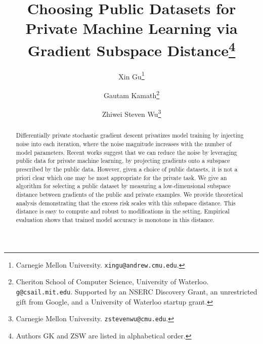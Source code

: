 \documentclass[11pt]{article}
\title{Choosing Public Datasets for Private Machine Learning via Gradient Subspace Distance\thanks{Authors GK and ZSW are listed in alphabetical order.}}
\author{
Xin Gu\thanks{Carnegie Mellon University. {\tt xingu@andrew.cmu.edu}.}
\and
Gautam Kamath\thanks{Cheriton School of Computer Science, University of Waterloo. {\tt g@csail.mit.edu}. Supported by an NSERC Discovery Grant, an unrestricted gift from Google, and a University of Waterloo startup grant.}
\and
Zhiwei Steven Wu\thanks{Carnegie Mellon University. {\tt zstevenwu@cmu.edu}.}
}
\begin{document}
\maketitle

\begin{abstract}
Differentially private stochastic gradient descent privatizes model training by injecting noise into each iteration, where the noise magnitude increases with the number of model parameters.
  Recent works suggest that we can reduce the noise by leveraging public data for private machine learning, by projecting gradients onto a subspace prescribed by the public data. 
  However, given a choice of public datasets, it is not a priori clear which one may be most appropriate for the private task. 
  We give an algorithm for selecting a public dataset by measuring a low-dimensional subspace distance between gradients of the public and private examples. We provide theoretical analysis demonstrating that the excess risk scales with this subspace distance.
  This distance is easy to compute and robust to modifications in the setting.  
  Empirical evaluation shows that trained model accuracy is monotone in this distance.
\end{abstract}

\end{document}

